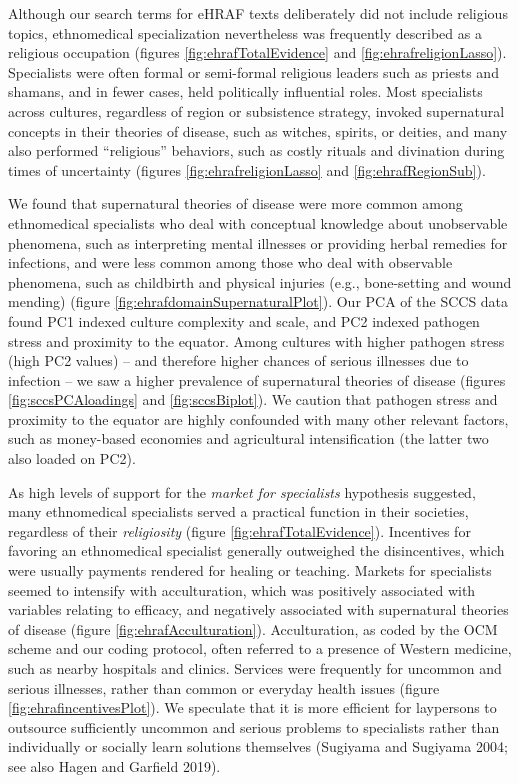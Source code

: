 \documentclass[
  11pt,
]{article}
\begin{document}
Although our search terms for eHRAF texts deliberately did not include religious topics, ethnomedical specialization nevertheless was frequently described as a religious occupation (figures \ref{fig:ehrafTotalEvidence} and \ref{fig:ehrafreligionLasso}). Specialists were often formal or semi-formal religious leaders such as priests and shamans, and in fewer cases, held politically influential roles. Most specialists across cultures, regardless of region or subsistence strategy, invoked supernatural concepts in their theories of disease, such as witches, spirits, or deities, and many also performed ``religious'' behaviors, such as costly rituals and divination during times of uncertainty (figures \ref{fig:ehrafreligionLasso} and \ref{fig:ehrafRegionSub}).

We found that supernatural theories of disease were more common among ethnomedical specialists who deal with conceptual knowledge about unobservable phenomena, such as interpreting mental illnesses or providing herbal remedies for infections, and were less common among those who deal with observable phenomena, such as childbirth and physical injuries (e.g., bone-setting and wound mending) (figure \ref{fig:ehrafdomainSupernaturalPlot}). Our PCA of the SCCS data found PC1 indexed culture complexity and scale, and PC2 indexed pathogen stress and proximity to the equator. Among cultures with higher pathogen stress (high PC2 values) -- and therefore higher chances of serious illnesses due to infection -- we saw a higher prevalence of supernatural theories of disease (figures \ref{fig:sccsPCAloadings} and \ref{fig:sccsBiplot}). We caution that pathogen stress and proximity to the equator are highly confounded with many other relevant factors, such as money-based economies and agricultural intensification (the latter two also loaded on PC2).

As high levels of support for the \emph{market for specialists} hypothesis suggested, many ethnomedical specialists served a practical function in their societies, regardless of their \emph{religiosity} (figure \ref{fig:ehrafTotalEvidence}). Incentives for favoring an ethnomedical specialist generally outweighed the disincentives, which were usually payments rendered for healing or teaching. Markets for specialists seemed to intensify with acculturation, which was positively associated with variables relating to efficacy, and negatively associated with supernatural theories of disease (figure \ref{fig:ehrafAcculturation}). Acculturation, as coded by the OCM scheme and our coding protocol, often referred to a presence of Western medicine, such as nearby hospitals and clinics. Services were frequently for uncommon and serious illnesses, rather than common or everyday health issues (figure \ref{fig:ehrafincentivesPlot}). We speculate that it is more efficient for laypersons to outsource sufficiently uncommon and serious problems to specialists rather than individually or socially learn solutions themselves (Sugiyama and Sugiyama 2004; see also Hagen and Garfield 2019).
\end{document}
